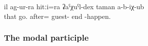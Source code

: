\begin{exe}
	\ex	\label{ex:After that had happened their friendship did not finish.}
	\gll	il	ag-ur-ra	hitːi=ra	ʡaˁχuˁl-dex	taman	a-b-iχ-ub\\
		that	go.	after= guest-	end	-happen.\\
	\glt	{}
\end{exe}



\subsubsection{The modal participle }
\label{sssec:The modal participle -an}

